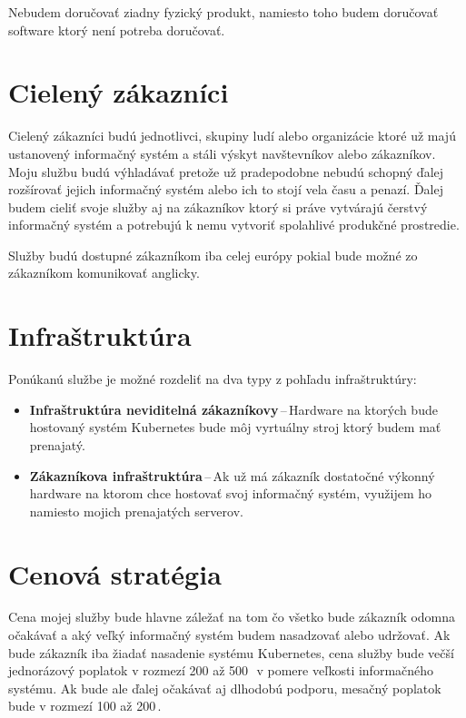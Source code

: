 Nebudem doručovať ziadny fyzický produkt, namiesto toho budem doručovať software ktorý není potreba doručovať.

\section{Cielený zákazníci}

Cielený zákazníci budú jednotlivci, skupiny ludí alebo organizácie ktoré už majú ustanovený informačný systém a stáli výskyt navštevníkov alebo zákazníkov. Moju službu budú výhladávať pretože už pradepodobne nebudú schopný ďalej rozšírovať jejich informačný systém alebo ich to stojí vela času a penazí. Ďalej budem cieliť svoje služby aj na zákazníkov ktorý si práve vytvárajú čerstvý informačný systém a potrebujú k nemu vytvoriť spolahlivé produkčné prostredie.

Služby budú dostupné zákazníkom iba celej európy pokial bude možné zo zákazníkom komunikovať anglicky.

\section{Infraštruktúra}

Ponúkanú službe je možné rozdeliť na dva typy z pohľadu infraštruktúry:
\begin{itemize}
  \item \textbf{Infraštruktúra neviditelná zákazníkovy}\,--\,Hardware na ktorých bude hostovaný systém Kubernetes bude môj vyrtuálny stroj ktorý budem mať prenajatý.
  \item \textbf{Zákazníkova infraštruktúra}\,--\,Ak už má zákazník dostatočné výkonný hardware na ktorom chce hostovať svoj informačný systém, využijem ho namiesto mojich prenajatých serverov.
\end{itemize}

\section{Cenová stratégia}

Cena mojej služby bude hlavne záležať na tom čo všetko bude zákazník odomna očakávať a aký veľký informačný systém budem nasadzovať alebo udržovať. Ak bude zákazník iba žiadať nasadenie systému Kubernetes, cena služby bude večší jednorázový poplatok v rozmezí 200 až 500\,\texteuro\ v pomere veľkosti informačného systému. Ak bude ale ďalej očakávať aj dlhodobú podporu, mesačný poplatok bude v rozmezí 100 až 200\,\texteuro.


